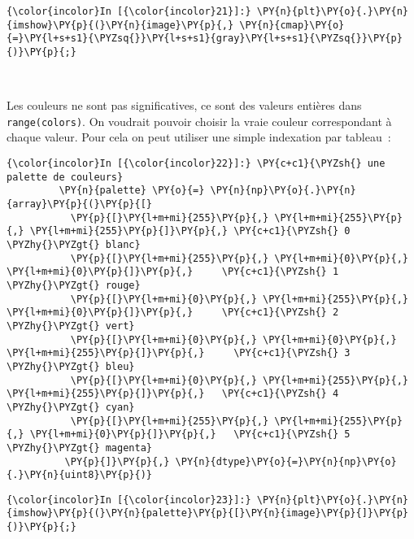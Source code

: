     \begin{Verbatim}[commandchars=\\\{\}]
{\color{incolor}In [{\color{incolor}21}]:} \PY{n}{plt}\PY{o}{.}\PY{n}{imshow}\PY{p}{(}\PY{n}{image}\PY{p}{,} \PY{n}{cmap}\PY{o}{=}\PY{l+s+s1}{\PYZsq{}}\PY{l+s+s1}{gray}\PY{l+s+s1}{\PYZsq{}}\PY{p}{)}\PY{p}{;}
\end{Verbatim}


    \begin{center}
    \end{center}
    { \hspace*{\fill} \\}
    
    Les couleurs ne sont pas significatives, ce sont des valeurs entières
dans \texttt{range(colors)}. On voudrait pouvoir choisir la vraie
couleur correspondant à chaque valeur. Pour cela on peut utiliser une
simple indexation par tableau~:

    \begin{Verbatim}[commandchars=\\\{\}]
{\color{incolor}In [{\color{incolor}22}]:} \PY{c+c1}{\PYZsh{} une palette de couleurs}
         \PY{n}{palette} \PY{o}{=} \PY{n}{np}\PY{o}{.}\PY{n}{array}\PY{p}{(}\PY{p}{[}
           \PY{p}{[}\PY{l+m+mi}{255}\PY{p}{,} \PY{l+m+mi}{255}\PY{p}{,} \PY{l+m+mi}{255}\PY{p}{]}\PY{p}{,} \PY{c+c1}{\PYZsh{} 0 \PYZhy{}\PYZgt{} blanc}
           \PY{p}{[}\PY{l+m+mi}{255}\PY{p}{,} \PY{l+m+mi}{0}\PY{p}{,} \PY{l+m+mi}{0}\PY{p}{]}\PY{p}{,}     \PY{c+c1}{\PYZsh{} 1 \PYZhy{}\PYZgt{} rouge}
           \PY{p}{[}\PY{l+m+mi}{0}\PY{p}{,} \PY{l+m+mi}{255}\PY{p}{,} \PY{l+m+mi}{0}\PY{p}{]}\PY{p}{,}     \PY{c+c1}{\PYZsh{} 2 \PYZhy{}\PYZgt{} vert}
           \PY{p}{[}\PY{l+m+mi}{0}\PY{p}{,} \PY{l+m+mi}{0}\PY{p}{,} \PY{l+m+mi}{255}\PY{p}{]}\PY{p}{,}     \PY{c+c1}{\PYZsh{} 3 \PYZhy{}\PYZgt{} bleu}
           \PY{p}{[}\PY{l+m+mi}{0}\PY{p}{,} \PY{l+m+mi}{255}\PY{p}{,} \PY{l+m+mi}{255}\PY{p}{]}\PY{p}{,}   \PY{c+c1}{\PYZsh{} 4 \PYZhy{}\PYZgt{} cyan}
           \PY{p}{[}\PY{l+m+mi}{255}\PY{p}{,} \PY{l+m+mi}{255}\PY{p}{,} \PY{l+m+mi}{0}\PY{p}{]}\PY{p}{,}   \PY{c+c1}{\PYZsh{} 5 \PYZhy{}\PYZgt{} magenta}
          \PY{p}{]}\PY{p}{,} \PY{n}{dtype}\PY{o}{=}\PY{n}{np}\PY{o}{.}\PY{n}{uint8}\PY{p}{)}
\end{Verbatim}


    \begin{Verbatim}[commandchars=\\\{\}]
{\color{incolor}In [{\color{incolor}23}]:} \PY{n}{plt}\PY{o}{.}\PY{n}{imshow}\PY{p}{(}\PY{n}{palette}\PY{p}{[}\PY{n}{image}\PY{p}{]}\PY{p}{)}\PY{p}{;}
\end{Verbatim}


